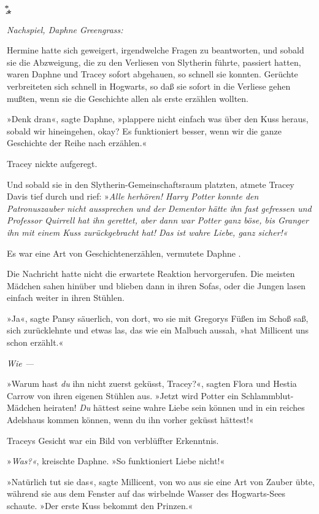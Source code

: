 {͙⃰⁎

\emph{Nachspiel, Daphne Greengrass:}

Hermine hatte sich geweigert, irgendwelche Fragen zu beantworten, und sobald sie die Abzweigung, die zu den Verliesen von Slytherin führte, passiert hatten, waren Daphne und Tracey sofort abgehauen, so schnell sie konnten. Gerüchte verbreiteten sich schnell in Hogwarts, so daß sie sofort in die Verliese gehen mußten, wenn sie die Geschichte allen als erste erzählen wollten.

»Denk dran«, sagte Daphne, »plappere nicht einfach was über den Kuss heraus, sobald wir hineingehen, okay? Es funktioniert besser, wenn wir die ganze Geschichte der Reihe nach erzählen.«

Tracey nickte aufgeregt.

Und sobald sie in den Slytherin-Gemeinschaftsraum platzten, atmete Tracey Davis tief durch und rief: »\emph{Alle herhören! Harry Potter konnte den Patronuszauber nicht aussprechen und der Dementor hätte ihn fast gefressen und Professor Quirrell hat ihn gerettet, aber dann war Potter ganz böse, bis Granger ihn mit einem Kuss zurückgebracht hat! Das ist wahre Liebe, ganz sicher!«}

Es war eine Art von Geschichtenerzählen, vermutete Daphne .

Die Nachricht hatte nicht die erwartete Reaktion hervorgerufen. Die meisten Mädchen sahen hinüber und blieben dann in ihren Sofas, oder die Jungen lasen einfach weiter in ihren Stühlen.

»Ja«, sagte Pansy säuerlich, von dort, wo sie mit Gregorys Füßen im Schoß saß, sich zurücklehnte und etwas las, das wie ein Malbuch aussah, »hat Millicent uns schon erzählt.«

\emph{Wie —}

»Warum hast \emph{du} ihn nicht zuerst geküsst, Tracey?«, sagten Flora und Hestia Carrow von ihren eigenen Stühlen aus. »Jetzt wird Potter ein Schlammblut-Mädchen heiraten! \emph{Du} hättest seine wahre Liebe sein können und in ein reiches Adelshaus kommen können, wenn du ihn vorher geküsst hättest!«

Traceys Gesicht war ein Bild von verblüffter Erkenntnis.

»\emph{Was?«}, kreischte Daphne. »So funktioniert Liebe nicht!«

»Natürlich tut sie das«, sagte Millicent, von wo aus sie eine Art von Zauber übte, während sie aus dem Fenster auf das wirbelnde Wasser des Hogwarts-Sees schaute. »Der erste Kuss bekommt den Prinzen.«

}
